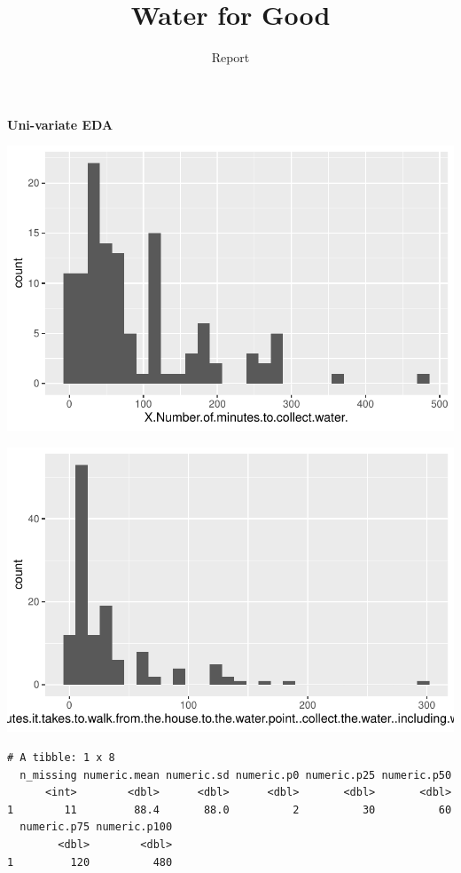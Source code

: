 \documentclass[
  letterpaper,
  DIV=11,
  numbers=noendperiod]{scrartcl}
\title{Water for Good}
\subtitle{Report}
\author{}
\date{}
\begin{document}
\maketitle
\ifdefined\Shaded\renewenvironment{Shaded}{\begin{tcolorbox}[interior hidden, boxrule=0pt, breakable, frame hidden, enhanced, borderline west={3pt}{0pt}{shadecolor}, sharp corners]}{\end{tcolorbox}}\fi

\textbf{Uni-variate EDA}

\includegraphics{report_files/figure-pdf/unnamed-chunk-3-1.pdf}

\includegraphics{report_files/figure-pdf/unnamed-chunk-4-1.pdf}

\begin{verbatim}
# A tibble: 1 x 8
  n_missing numeric.mean numeric.sd numeric.p0 numeric.p25 numeric.p50
      <int>        <dbl>      <dbl>      <dbl>       <dbl>       <dbl>
1        11         88.4       88.0          2          30          60
  numeric.p75 numeric.p100
        <dbl>        <dbl>
1         120          480
\end{verbatim}
\end{document}
